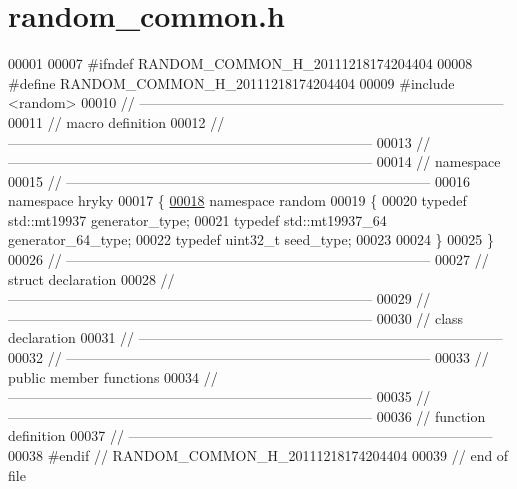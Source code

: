 \hypertarget{random__common_8h_source}{\section{random\-\_\-common.\-h}
}

\begin{DoxyCode}
00001 
00007 \textcolor{preprocessor}{#ifndef RANDOM\_COMMON\_H\_20111218174204404}
00008 \textcolor{preprocessor}{}\textcolor{preprocessor}{#define RANDOM\_COMMON\_H\_20111218174204404}
00009 \textcolor{preprocessor}{}\textcolor{preprocessor}{#include <random>}
00010 \textcolor{comment}{//
      ------------------------------------------------------------------------------}
00011 \textcolor{comment}{// macro definition}
00012 \textcolor{comment}{//
      ------------------------------------------------------------------------------}
00013 \textcolor{comment}{//
      ------------------------------------------------------------------------------}
00014 \textcolor{comment}{// namespace}
00015 \textcolor{comment}{//
      ------------------------------------------------------------------------------}
00016 \textcolor{keyword}{namespace }hryky
00017 \{
\hypertarget{random__common_8h_source_l00018}{}\hyperlink{namespacehryky_1_1random}{00018} \textcolor{keyword}{namespace }random
00019 \{
00020     \textcolor{keyword}{typedef} std::mt19937    generator\_type;
00021     \textcolor{keyword}{typedef} std::mt19937\_64 generator\_64\_type;
00022     \textcolor{keyword}{typedef} uint32\_t        seed\_type;
00023 
00024 \}
00025 \}
00026 \textcolor{comment}{//
      ------------------------------------------------------------------------------}
00027 \textcolor{comment}{// struct declaration}
00028 \textcolor{comment}{//
      ------------------------------------------------------------------------------}
00029 \textcolor{comment}{//
      ------------------------------------------------------------------------------}
00030 \textcolor{comment}{// class declaration}
00031 \textcolor{comment}{//
      ------------------------------------------------------------------------------}
00032 \textcolor{comment}{//
      ------------------------------------------------------------------------------}
00033 \textcolor{comment}{// public member functions}
00034 \textcolor{comment}{//
      ------------------------------------------------------------------------------}
00035 \textcolor{comment}{//
      ------------------------------------------------------------------------------}
00036 \textcolor{comment}{// function definition}
00037 \textcolor{comment}{//
      ------------------------------------------------------------------------------}
00038 \textcolor{preprocessor}{#endif // RANDOM\_COMMON\_H\_20111218174204404}
00039 \textcolor{preprocessor}{}\textcolor{comment}{// end of file}
\end{DoxyCode}
